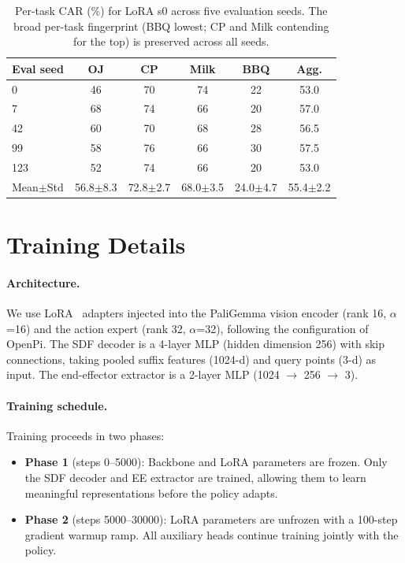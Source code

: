 \begin{table}[h]
\centering
\caption{Per-task CAR (\%) for LoRA s0 across five evaluation seeds. The broad per-task fingerprint (BBQ lowest; CP and Milk contending for the top) is preserved across all seeds.}
\label{tab:eval_seed_car_detail}
\vspace{2pt}
\footnotesize
\begin{tabular*}{\columnwidth}{l@{\extracolsep{\fill}}ccccc}
\toprule
Eval seed & OJ & CP & Milk & BBQ & Agg. \\
\midrule
0   & 46 & 70 & 74 & 22 & 53.0 \\
7   & 68 & 74 & 66 & 20 & 57.0 \\
42  & 60 & 70 & 68 & 28 & 56.5 \\
99  & 58 & 76 & 66 & 30 & 57.5 \\
123 & 52 & 74 & 66 & 20 & 53.0 \\
\midrule
Mean$\pm$Std & 56.8$\pm$8.3 & 72.8$\pm$2.7 & 68.0$\pm$3.5 & 24.0$\pm$4.7 & 55.4$\pm$2.2 \\
\bottomrule
\end{tabular*}
\end{table}


\section{Training Details}
\label{sec:appendix_training}

\paragraph{Architecture.}
We use LoRA~\cite{hu2022lora} adapters injected into the PaliGemma vision encoder (rank 16, $\alpha$=16) and the action expert (rank 32, $\alpha$=32), following the configuration of OpenPi. The SDF decoder is a 4-layer MLP (hidden dimension 256) with skip connections, taking pooled suffix features (1024-d) and query points (3-d) as input. The end-effector extractor is a 2-layer MLP (1024 $\to$ 256 $\to$ 3).

\paragraph{Training schedule.}
Training proceeds in two phases:
\begin{itemize}
    \item \textbf{Phase 1} (steps 0--5000): Backbone and LoRA parameters are frozen. Only the SDF decoder and EE extractor are trained, allowing them to learn meaningful representations before the policy adapts.
    \item \textbf{Phase 2} (steps 5000--30000): LoRA parameters are unfrozen with a 100-step gradient warmup ramp. All auxiliary heads continue training jointly with the policy.
\end{itemize}

